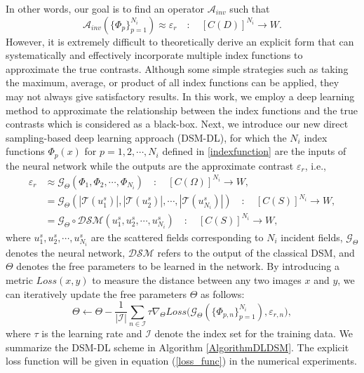 \documentclass{article}
\begin{document}
In other words, our goal is to find an operator $\mathcal{A}_{inv}$ such that
\begin{equation}
	\mathcal{A}_{inv}(\{\Phi_{p}\}_{p=1}^{N_{i}}) \approx \varepsilon_{r} \quad : \quad [C(D)]^{N_{i}}\rightarrow W.
\end{equation}
    However, it is extremely difficult to theoretically derive an explicit form that can systematically and effectively incorporate multiple index functions to approximate the true contrasts. Although some simple strategies such as taking the maximum, average, or product of all index functions can be applied, they may not always give satisfactory results. In this work, we employ a deep learning method to approximate the relationship between the index functions and the true contrasts which is considered as a black-box. Next, we introduce our new direct sampling-based deep learning approach (DSM-DL), for which the $N_{i}$ index functions $\Phi_{p}(x)$ for $p=1,2,\cdots,N_{i}$ defined in \eqref{indexfunction} are the inputs of the neural network while the outputs are the approximate contrast $\varepsilon_{r}$, i.e., 
	\begin{equation}
		\begin{split}
			\varepsilon_{r}&\approx \mathcal{G}_{\Theta}(\Phi_{1},\Phi_{2},\cdots,\Phi_{N_{i}}) \quad : \quad [C(\Omega)]^{N_{i}}\rightarrow W,\\
			& = \mathcal{G}_{\Theta}(|\mathcal{T}(u^{s}_{1})|,|\mathcal{T}(u^{s}_{2})|,\cdots,|\mathcal{T}(u^{s}_{N_{i}})|) \quad : \quad [C(S)]^{N_{i}}\rightarrow W,\\
			& = \mathcal{G}_{\Theta}\circ \mathcal{DSM}(u_{1}^{s},u_{2}^{s},\cdots,u^{s}_{N_{i}})\quad : \quad [C(S)]^{N_{i}}\rightarrow W, 
		\end{split}		
	\end{equation} 
	where $u_{1}^{s},u_{2}^{s},\cdots,u_{N_{i}}^{s}$ are the scattered fields corresponding to $N_{i}$ incident fields, $\mathcal{G}_{\Theta}$ denotes the neural network, $\mathcal{DSM}$ refers to the output of the classical DSM, and $\Theta$ denotes the free parameters to be learned in the network. By introducing a metric $Loss(x,y)$ to measure the distance between any two images $x$ and $y$, we can iteratively update the free parameters $\Theta$ as follows:
	\begin{equation}
		\Theta\leftarrow\Theta-\frac{1}{|\mathcal{I}|}\sum_{n\in \mathcal{I}}\tau\nabla_{\Theta}Loss\bigg(\mathcal{G}_\Theta(\{\Phi_{p,n}\}_{p=1}^{N_{i}}),\varepsilon_{r,n}\bigg),
  \label{eq:loss_func}
	\end{equation} 
where $\tau$ is the learning rate and $\mathcal{I}$ denote the index set for the training data. We summarize the DSM-DL scheme in Algorithm \ref{AlgorithmDLDSM}. The explicit loss function will be given in equation (\ref{loss_func}) in the numerical experiments.
    
\end{document}

